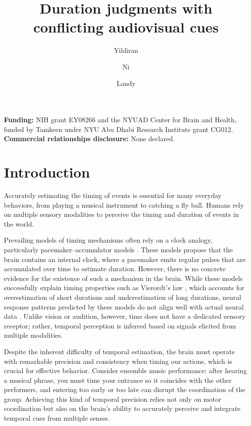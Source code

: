 \documentclass{biorxiv}
\title{Duration judgments with conflicting audiovisual cues}
\author{Yildiran}{\"{O}mer F.}{Department of Psychology, New York University}{New York, NY, USA}{}{omer.yildiran@nyu.edu}
\author{Ni}{Long}{Department of Psychology and Center for Neural Science, New York University}{New York, NY, USA}{}{}
\author{Landy}{Michael S.}{Department of Psychology and Center for Neural Science, New York University}{New York, NY, USA}{}{}
\providecommand{\citep}[1]{\cite{#1}}
\begin{document}
\maketitle

\noindent\textbf{Funding:} NIH grant EY08266 and the NYUAD Center for Brain and Health, funded by Tamkeen under NYU Abu Dhabi Research Institute grant CG012.\\
\textbf{Commercial relationships disclosure:} None declared.


\section{Introduction}

Accurately estimating the timing of events is essential for many everyday behaviors, from playing a musical instrument to catching a fly ball. Humans rely on multiple sensory modalities to perceive the timing and duration of events in the world. 

Prevailing models of timing mechanisms often rely on a clock analogy, particularly pacemaker--accumulator models \citep{treisman1963temporal,gibbon1977scalar,wittmann2009inner,grondin2014non,hartcher2016single,grondin2025perception}. These models propose that the brain contains an internal clock, where a pacemaker emits regular pulses that are accumulated over time to estimate duration. However, there is no concrete evidence for the existence of such a mechanism in the brain. While these models successfully explain timing properties such as Vierordt's law \citep{lejeune2009vierordt,jazayeri2010temporal,mamassian2010s}, which accounts for overestimation of short durations and underestimation of long durations, neural response patterns predicted by these models do not align well with actual neural data \citep{buonomano2010population,muller2014perceiving,kononowicz2016search}. 
Unlike vision or audition, however, time does not have a dedicated sensory receptor; rather, temporal perception is inferred based on signals elicited from multiple modalities.

Despite the inherent difficulty of temporal estimation, the brain must operate with remarkable precision and consistency when timing our actions, which is crucial for effective behavior. Consider ensemble music performance: after hearing a musical phrase, you must time your entrance so it coincides with the other performers, and entering too early or too late can disrupt the coordination of the group. Achieving this kind of temporal precision relies not only on motor coordination but also on the brain's ability to accurately perceive and integrate temporal cues from multiple senses.
\end{document}
